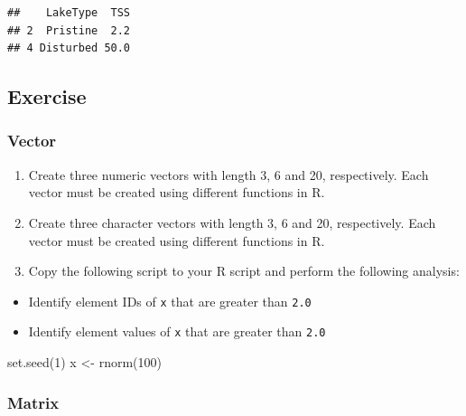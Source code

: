 \documentclass[
]{article}
\newenvironment{Shaded}{\begin{snugshade}}{\end{snugshade}}
\newcommand{\DecValTok}[1]{\textcolor[rgb]{0.00,0.00,0.81}{#1}}
\newcommand{\FunctionTok}[1]{\textcolor[rgb]{0.00,0.00,0.00}{#1}}
\newcommand{\NormalTok}[1]{#1}
\newcommand{\OtherTok}[1]{\textcolor[rgb]{0.56,0.35,0.01}{#1}}
\providecommand{\tightlist}{%
  \setlength{\itemsep}{0pt}\setlength{\parskip}{0pt}}
\begin{document}
\begin{verbatim}
##    LakeType  TSS
## 2  Pristine  2.2
## 4 Disturbed 50.0
\end{verbatim}

\hypertarget{exercise}{%
\subsection{Exercise}\label{exercise}}

\hypertarget{vector-1}{%
\subsubsection{Vector}\label{vector-1}}

\begin{enumerate}
\def\labelenumi{\alph{enumi}.}
\tightlist
\item
  Create three numeric vectors with length 3, 6 and 20, respectively. Each vector must be created using different functions in R.
\item
  Create three character vectors with length 3, 6 and 20, respectively. Each vector must be created using different functions in R.
\item
  Copy the following script to your R script and perform the following analysis:
\end{enumerate}

\begin{itemize}
\tightlist
\item
  Identify element IDs of \texttt{x} that are greater than \texttt{2.0}
\item
  Identify element values of \texttt{x} that are greater than \texttt{2.0}
\end{itemize}

\begin{Shaded}
\begin{Highlighting}[]
\FunctionTok{set.seed}\NormalTok{(}\DecValTok{1}\NormalTok{)}
\NormalTok{x }\OtherTok{\textless{}{-}} \FunctionTok{rnorm}\NormalTok{(}\DecValTok{100}\NormalTok{)}
\end{Highlighting}
\end{Shaded}

\hypertarget{matrix-1}{%
\subsubsection{Matrix}\label{matrix-1}}
\end{document}
